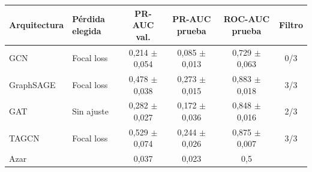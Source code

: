 \begin{tabular}{llcccc}
\toprule
Arquitectura & Pérdida elegida & PR-AUC val. & PR-AUC prueba & ROC-AUC prueba & Filtro \\
\midrule
GCN & Focal loss & 0{,}214 $\pm$ 0{,}054 & 0{,}085 $\pm$ 0{,}013 & 0{,}729 $\pm$ 0{,}063 & 0/3 \\
GraphSAGE & Focal loss & 0{,}478 $\pm$ 0{,}038 & 0{,}273 $\pm$ 0{,}015 & 0{,}883 $\pm$ 0{,}018 & 3/3 \\
GAT & Sin ajuste & 0{,}282 $\pm$ 0{,}027 & 0{,}172 $\pm$ 0{,}036 & 0{,}848 $\pm$ 0{,}016 & 2/3 \\
TAGCN & Focal loss & 0{,}529 $\pm$ 0{,}074 & 0{,}244 $\pm$ 0{,}026 & 0{,}875 $\pm$ 0{,}007 & 3/3 \\
\midrule
Azar & & 0{,}037 & 0{,}023 & 0{,}5 & \\
\bottomrule
\end{tabular}
